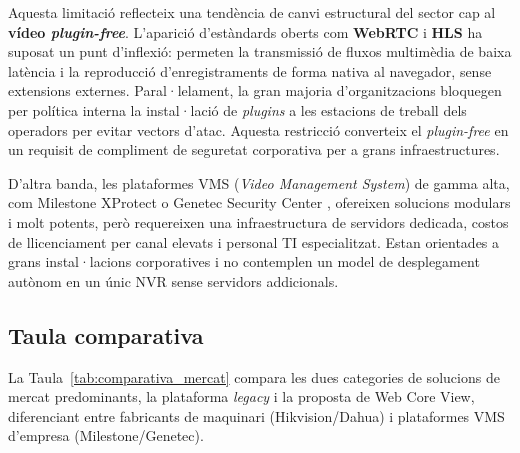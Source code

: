 Aquesta limitació reflecteix una tendència de canvi estructural del sector cap al \textbf{vídeo \textit{plugin-free}}. L'aparició d'estàndards oberts com \textbf{WebRTC} \cite{rfc8825} i \textbf{HLS} \cite{hls_apple} ha suposat un punt d'inflexió: permeten la transmissió de fluxos multimèdia de baixa latència i la reproducció d'enregistraments de forma nativa al navegador, sense extensions externes. Paral·lelament, la gran majoria d'organitzacions bloquegen per política interna la instal·lació de \textit{plugins} a les estacions de treball dels operadors per evitar vectors d'atac. Aquesta restricció converteix el \textit{plugin-free} en un requisit de compliment de seguretat corporativa per a grans infraestructures.

D'altra banda, les plataformes VMS (\textit{Video Management System}) de gamma alta, com Milestone XProtect \cite{milestone_xprotect} o Genetec Security Center \cite{genetec_security_center}, ofereixen solucions modulars i molt potents, però requereixen una infraestructura de servidors dedicada, costos de llicenciament per canal elevats i personal TI especialitzat. Estan orientades a grans instal·lacions corporatives i no contemplen un model de desplegament autònom en un únic NVR sense servidors addicionals.

\subsection{Taula comparativa}
La Taula~\ref{tab:comparativa_mercat} compara les dues categories de solucions de mercat predominants, la plataforma \textit{legacy} i la proposta de Web Core View, diferenciant entre fabricants de maquinari (Hikvision/Dahua) i plataformes VMS d'empresa (Milestone/Genetec).

